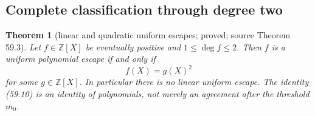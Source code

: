 \documentclass[10pt,reqno]{amsart}
\newtheorem{theorem}{Theorem}[section]
\theoremstyle{definition}
\newcommand{\1}{\mathbf 1}
\begin{document}
\subsection{Complete classification through degree two}
\begin{theorem}[linear and quadratic uniform escapes; proved; source
Theorem 59.3]
\label{thm:quadratic-escape}
Let $f\in\mathbb Z[X]$ be eventually positive and $1\leq\deg f\leq2$.
Then $f$ is a uniform polynomial escape if and only if
\begin{equation}\tag{59.10}
                         f(X)=g(X)^2
\end{equation}
for some $g\in\mathbb Z[X]$.  In particular there is no linear uniform
escape.  The identity (59.10) is an identity of polynomials, not merely an
agreement after the threshold $m_0$.
\end{theorem}
\end{document}
